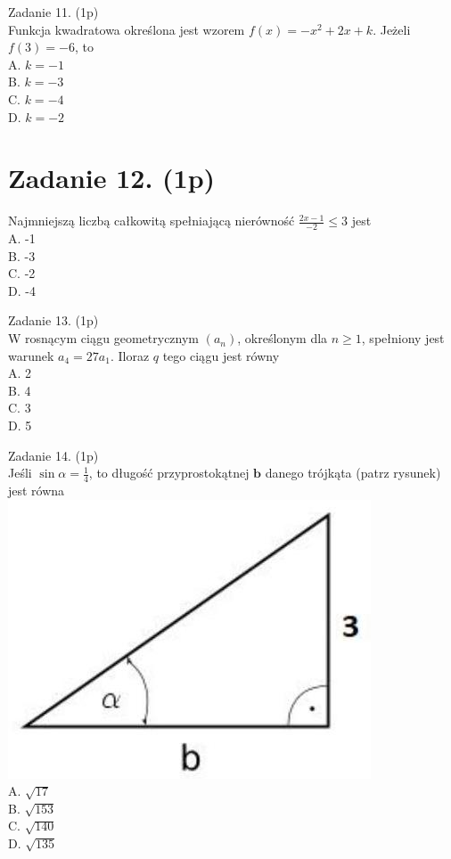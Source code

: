 \documentclass[10pt]{article}
\begin{document}
Zadanie 11. (1p)\\
Funkcja kwadratowa określona jest wzorem \(f(x)=-x^{2}+2 x+k\). Jeżeli \(f(3)=-6\), to\\
A. \(k=-1\)\\
B. \(k=-3\)\\
C. \(k=-4\)\\
D. \(k=-2\)

\section*{Zadanie 12. (1p)}
Najmniejszą liczbą całkowitą spełniającą nierówność \(\frac{2 x-1}{-2} \leq 3\) jest\\
A. -1\\
B. -3\\
C. -2\\
D. -4

Zadanie 13. (1p)\\
W rosnącym ciągu geometrycznym \(\left(a_{n}\right)\), określonym dla \(n \geq 1\), spełniony jest warunek \(a_{4}=27 a_{1}\). Iloraz \(q\) tego ciągu jest równy\\
A. 2\\
B. 4\\
C. 3\\
D. 5

Zadanie 14. (1p)\\
Jeśli \(\sin \alpha=\frac{1}{4}\), to długość przyprostokątnej \(\boldsymbol{b}\) danego trójkąta (patrz rysunek) jest równa\\
\includegraphics[max width=\textwidth, center]{2024_11_21_19ede52d758866b0d67eg-04}\\
A. \(\sqrt{17}\)\\
B. \(\sqrt{153}\)\\
C. \(\sqrt{140}\)\\
D. \(\sqrt{135}\)
\end{document}
